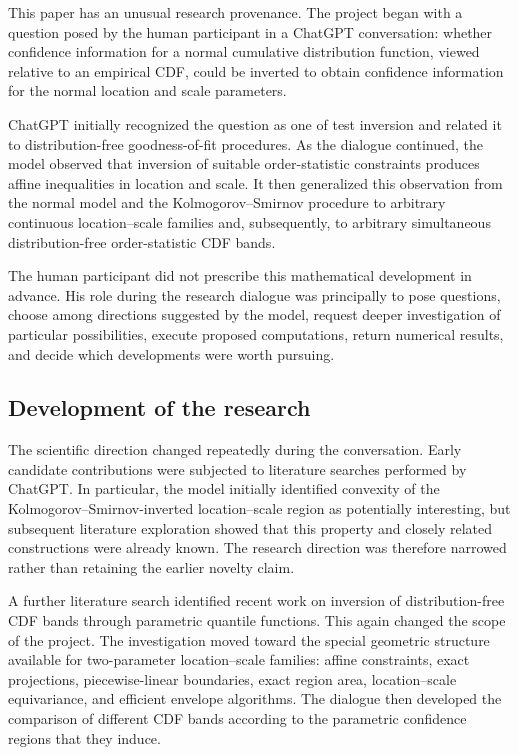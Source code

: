\documentclass[11pt]{article}
\begin{document}
This paper has an unusual research provenance.  The project began with
a question posed by the human participant in a ChatGPT conversation:
whether confidence information for a normal cumulative distribution
function, viewed relative to an empirical CDF, could be inverted to
obtain confidence information for the normal location and scale
parameters.

ChatGPT initially recognized the question as one of test inversion and
related it to distribution-free goodness-of-fit procedures.  As the
dialogue continued, the model observed that inversion of suitable
order-statistic constraints produces affine inequalities in location
and scale.  It then generalized this observation from the normal model
and the Kolmogorov--Smirnov procedure to arbitrary continuous
location--scale families and, subsequently, to arbitrary simultaneous
distribution-free order-statistic CDF bands.

The human participant did not prescribe this mathematical development
in advance.  His role during the research dialogue was principally to
pose questions, choose among directions suggested by the model, request
deeper investigation of particular possibilities, execute proposed
computations, return numerical results, and decide which developments
were worth pursuing.

\subsection*{Development of the research}

The scientific direction changed repeatedly during the conversation.
Early candidate contributions were subjected to literature searches
performed by ChatGPT.  In particular, the model initially identified
convexity of the Kolmogorov--Smirnov-inverted location--scale region as
potentially interesting, but subsequent literature exploration showed
that this property and closely related constructions were already
known.  The research direction was therefore narrowed rather than
retaining the earlier novelty claim.

A further literature search identified recent work on inversion of
distribution-free CDF bands through parametric quantile functions.
This again changed the scope of the project.  The investigation moved
toward the special geometric structure available for two-parameter
location--scale families: affine constraints, exact projections,
piecewise-linear boundaries, exact region area, location--scale
equivariance, and efficient envelope algorithms.  The dialogue then
developed the comparison of different CDF bands according to the
parametric confidence regions that they induce.
\end{document}
